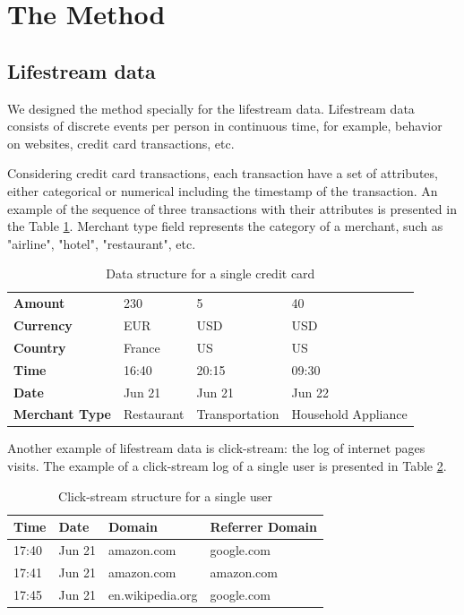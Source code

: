 \documentclass[sigconf, anonymous]{acmart}
\begin{document}
\section{The Method} \label{sec-method}

\subsection{Lifestream data}

We designed the method specially for the lifestream data. Lifestream data consists of discrete events per person in continuous time, for example,  behavior on websites, credit card transactions, etc. 

Considering credit card transactions, each transaction have a set of attributes, either categorical or numerical including the timestamp of the transaction. An example of the sequence of three transactions with their attributes is presented in the Table \ref{tab-tr-data}.
Merchant type field represents the category of a merchant, such as "airline", "hotel", "restaurant", etc.

\begin{table}[h]
\caption{Data structure for a single credit card}
\begin{tabular}{ | m{7em} |  m{5em} m{5em} m{5em}| }
\hline
\textbf{Amount} & 230 & 5 & 40 \\
\textbf{Currency} & EUR & USD & USD \\
\textbf{Country} & France & US & US \\
\textbf{Time} & 16:40 & 20:15 & 09:30 \\
\textbf{Date} & Jun 21 & Jun 21 & Jun 22 \\
\textbf{Merchant Type} & Restaurant & Transport\-ation & Household Appliance \\
\hline
\end{tabular}
\label{tab-tr-data}
\end{table}

Another example of lifestream data is click-stream: the log of internet pages  visits. The example of a click-stream log of a single user is presented in Table \ref{tab-cs-data}.

\begin{table}[h]
\caption{Click-stream structure for a single user}
\begin{tabular}{ | m{2em} m{3em} m{7em} m{10em} | }
\hline
\textbf{Time} & \textbf{Date} & \textbf{Domain} & \textbf{Referrer Domain} \\
\hline
17:40 & Jun 21 & amazon.com & google.com \\
17:41 & Jun 21 & amazon.com & amazon.com \\
17:45 & Jun 21 & en.wikipedia.org & google.com \\
\hline
\end{tabular}
\label{tab-cs-data}
\end{table}
\end{document}
